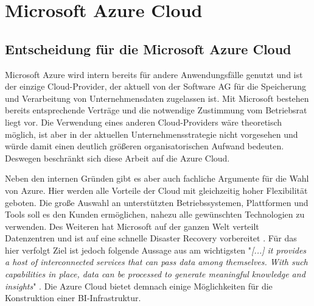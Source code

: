 \section{Microsoft Azure Cloud} \label{sec:grundlagen:bi_in_der_cloud_mit_azure}

\subsection{Entscheidung für die Microsoft Azure Cloud} \label{subsec:grundlagen:azure:entscheidungFürAzure}
Microsoft Azure wird intern bereits für andere Anwendungsfälle genutzt und ist der einzige Cloud-Provider, der aktuell von der Software AG für die Speicherung und Verarbeitung von Unternehmensdaten zugelassen ist. Mit Microsoft bestehen bereits entsprechende Verträge und die notwendige Zustimmung vom Betriebsrat liegt vor. Die Verwendung eines anderen Cloud-Providers wäre theoretisch möglich, ist aber in der aktuellen Unternehmensstrategie nicht vorgesehen und würde damit einen deutlich größeren organisatorischen Aufwand bedeuten. Deswegen beschränkt sich diese Arbeit auf die Azure Cloud.

Neben den internen Gründen gibt es aber auch fachliche Argumente für die Wahl von Azure. Hier werden alle Vorteile der Cloud mit gleichzeitig hoher Flexibilität geboten. Die große Auswahl an unterstützten Betriebssystemen, Plattformen und Tools soll es den Kunden ermöglichen, nahezu alle gewünschten Technologien zu verwenden. Des Weiteren hat Microsoft auf der ganzen Welt verteilt Datenzentren und ist auf eine schnelle Disaster Recovery vorbereitet \cite{modi_azure_2020}. Für das hier verfolgt Ziel ist jedoch folgende Aussage aus  am wichtigsten "\textit{[...] it provides a host of interconnected services that can pass data among themselves. With such capabilities in place, data can be processed to generate meaningful knowledge and insights}" \cite{modi_azure_2020}. Die Azure Cloud bietet demnach einige Möglichkeiten für die Konstruktion einer BI-Infrastruktur.

